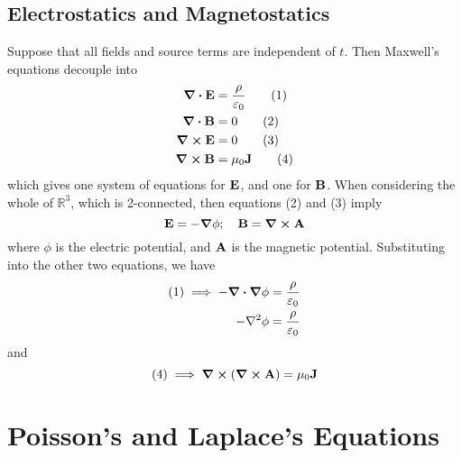 \documentclass{article}
\begin{document}
\subsection{Electrostatics and Magnetostatics}
Suppose that all fields and source terms are independent of $t$. Then Maxwell's equations decouple into
\begin{align}
	\div{\vb E}  & = \frac{\rho}{\varepsilon_0} \tag{1} \\
	\div{\vb B}  & = 0                          \tag{2} \\
	\curl{\vb E} & = 0                          \tag{3} \\
	\curl{\vb B} & = \mu_0 \vb J \tag{4}
\end{align}
which gives one system of equations for $\vb E$, and one for $\vb B$. When considering the whole of $\mathbb R^3$, which is 2-connected, then equations (2) and (3) imply
\[ \vb E = -\grad \phi;\quad \vb B = \curl \vb A \]
where $\phi$ is the electric potential, and $\vb A$ is the magnetic potential. Substituting into the other two equations, we have
\begin{align*}
	(1) \implies -\div{\grad \phi} & = \frac{\rho}{\varepsilon_0} \\
	-\laplacian \phi               & = \frac{\rho}{\varepsilon_0}
\end{align*}
and
\[ (4) \implies \curl(\curl{\vb A}) = \mu_0 \vb J \]

\section{Poisson's and Laplace's Equations}
\end{document}
